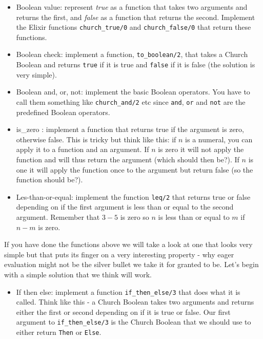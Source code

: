 \documentclass[a4paper,11pt]{article}
\begin{document}
\begin{itemize}

\item Boolean value: represent {\em true} as a function that takes two
  arguments and returns the first, and {\em false} as a function that
  returns the second.  Implement the Elixir functions {\tt church_true/0} and
  {\tt church_false/0} that return these functions.
  
\item Boolean check: implement a function, {\tt to_boolean/2},  that takes a Church Boolean
  and returns {\tt true} if it is true and {\tt false} if it is false
  (the solution is very simple).
  
\item Boolean and, or, not: implement the basic Boolean operators. You have to
  call them something like {\tt church_and/2} etc since {\tt and},
  {\tt or} and {\tt not} are the predefined Boolean operators.

\item is\_zero : implement a function that returns true if the argument
  is zero, otherwise false. This is tricky but think like this: if $n$
  is a numeral, you can apply it to a function and an argument. If $n$ is
  zero it will not apply the function and will thus return the
  argument (which should then be?). If $n$ is one it will apply the
  function once to the argument but return false (so the function should be?).

\item Les-than-or-equal: implement the function {\tt leq/2} that
  returns true or false depending on if the first argument is less
  than or equal to the second argument. Remember that $3-5$ is zero so
  $n$ is less than or equal to $m$ if $n - m$ is zero.
\end{itemize}

If you have done the functions above we will take a look at one that
looks very simple but that puts its finger on a very interesting
property - why eager evaluation might not be the silver bullet we take
it for granted to be. Let's begin with a simple solution that we think
will work.


\begin{itemize}
\item If then else: implement a function {\tt if_then_else/3} that
  does what it is called. Think like this - a Church Boolean takes two
  arguments and returns either the first or second depending on if it
  is true or false. Our first argument to {\tt if_then_else/3} is the
  Church Boolean that we should use to either return {\tt Then} or {\tt Else}. 
\end{itemize}
\end{document}
